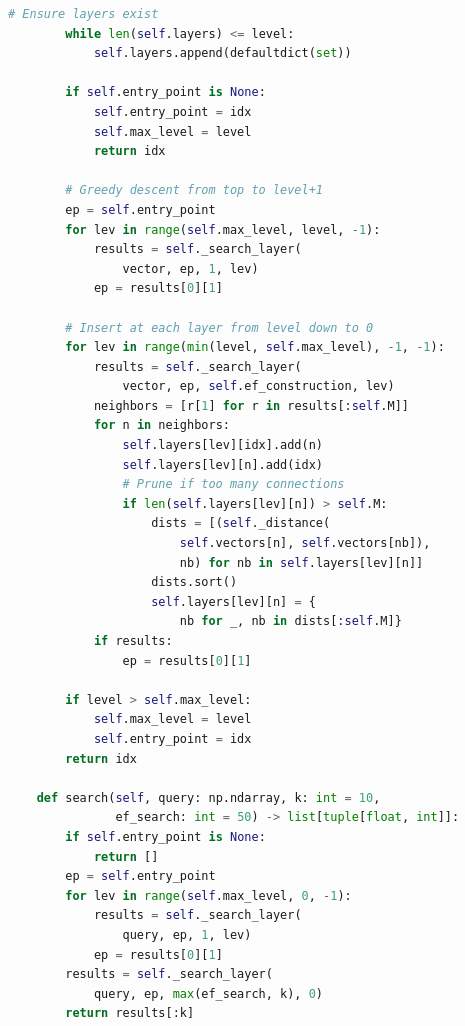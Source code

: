 \begin{lstlisting}[language=Python]
        # Ensure layers exist
        while len(self.layers) <= level:
            self.layers.append(defaultdict(set))

        if self.entry_point is None:
            self.entry_point = idx
            self.max_level = level
            return idx

        # Greedy descent from top to level+1
        ep = self.entry_point
        for lev in range(self.max_level, level, -1):
            results = self._search_layer(
                vector, ep, 1, lev)
            ep = results[0][1]

        # Insert at each layer from level down to 0
        for lev in range(min(level, self.max_level), -1, -1):
            results = self._search_layer(
                vector, ep, self.ef_construction, lev)
            neighbors = [r[1] for r in results[:self.M]]
            for n in neighbors:
                self.layers[lev][idx].add(n)
                self.layers[lev][n].add(idx)
                # Prune if too many connections
                if len(self.layers[lev][n]) > self.M:
                    dists = [(self._distance(
                        self.vectors[n], self.vectors[nb]),
                        nb) for nb in self.layers[lev][n]]
                    dists.sort()
                    self.layers[lev][n] = {
                        nb for _, nb in dists[:self.M]}
            if results:
                ep = results[0][1]

        if level > self.max_level:
            self.max_level = level
            self.entry_point = idx
        return idx

    def search(self, query: np.ndarray, k: int = 10,
               ef_search: int = 50) -> list[tuple[float, int]]:
        if self.entry_point is None:
            return []
        ep = self.entry_point
        for lev in range(self.max_level, 0, -1):
            results = self._search_layer(
                query, ep, 1, lev)
            ep = results[0][1]
        results = self._search_layer(
            query, ep, max(ef_search, k), 0)
        return results[:k]
\end{lstlisting}

